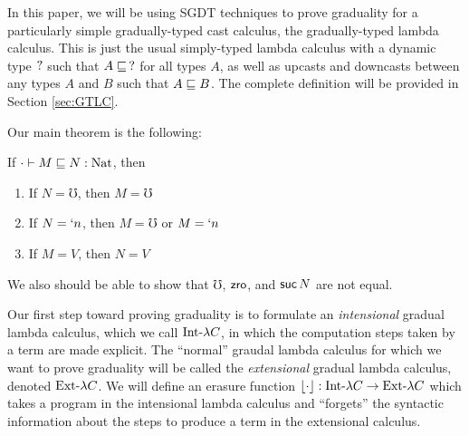 \documentclass[acmsmall,screen]{acmart}
\begin{document}

  In this paper, we will be using SGDT techniques to prove graduality for a particularly
  simple gradually-typed cast calculus, the gradually-typed lambda calculus. This is just
  the usual simply-typed lambda calculus with a dynamic type $?$ such that $A \sqsubseteq\, ?$ for all types $A$,
  as well as upcasts and downcasts between any types $A$ and $B$ such that $A \sqsubseteq B$.
  The complete definition will be provided in Section \ref{sec:GTLC}.

  Our main theorem is the following:

  
  

  \begin{theorem}[Graduality]
    If $\cdot \vdash M \sqsubseteq N : \text{Nat}$, then
    \begin{enumerate}
      \item If $N = \mho$, then $M = \mho$
      \item If $N = `n$, then $M = \mho$ or $M = `n$
      \item If $M = V$, then $N = V$
    \end{enumerate}
  \end{theorem}

  We also should be able to show that $\mho$, $\textsf{zro}$, and $\textsf{suc}\, N$ are not equal.

  Our first step toward proving graduality is to formulate an \emph{intensional} gradual lambda calculus,
  which we call $\text{Int-}\lambda C$, in which the computation steps taken by a term are made explicit.
  The ``normal'' graudal lambda calculus for which we want to prove graduality will be called the
  \emph{extensional} gradual lambda calculus, denoted $\text{Ext-}\lambda C$. We will define an erasure function
  $\lfloor {\cdot} \rfloor : \text{Int-}\lambda C \to \text{Ext-}\lambda C$ which takes a program in the intensional lambda calculus
  and ``forgets'' the syntactic information about the steps to produce a term in the extensional calculus.
\end{document}
